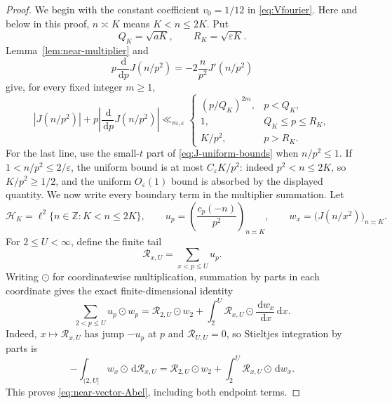 \documentclass[11pt]{article}
\numberwithin{equation}{section}
\theoremstyle{definition}
\newcommand{\Z}{\mathbb Z}
\newcommand{\1}{\mathbf 1}
\newcommand{\dd}{\,\mathrm d}
\begin{document}
\begin{proof}
We begin with the constant coefficient \(v_0=1/12\) in
\eqref{eq:Vfourier}.  Here and below in this proof, \(n\asymp K\)
means \(K<n\le2K\).  Put
\[
 Q_K=\sqrt{aK},\qquad R_K=\sqrt{\varepsilon K}.
\]
Lemma~\ref{lem:near-multiplier} and
\[
 p\frac{\dd}{\dd p}J(n/p^2)
 =-2\frac n{p^2}J'(n/p^2)
\]
give, for every fixed integer \(m\ge1\),
\begin{equation}\label{eq:Jbounds}
 |J(n/p^2)|+
 p\left|\frac{\dd}{\dd p}J(n/p^2)\right|
 \ll_{m,\varepsilon}
 \begin{cases}
 (p/Q_K)^{2m},&p<Q_K,\\
 1,&Q_K\le p\le R_K,\\
 K/p^2,&p>R_K.
 \end{cases}
\end{equation}
For the last line, use the small-\(t\) part of
\eqref{eq:J-uniform-bounds} when \(n/p^2\le1\).  If
\(1<n/p^2\le2/\varepsilon\), the uniform bound is at most
\(C_\varepsilon K/p^2\): indeed \(p^2<n\le2K\), so
\(K/p^2\ge1/2\), and the uniform \(O_\varepsilon(1)\) bound is
absorbed by the displayed quantity.
We now write every boundary term in the multiplier summation.  Let
\[
 \mathcal H_K=\ell^2\{n\in\Z:K<n\le2K\},\qquad
 u_p=\left(\frac{c_p(-n)}{p^2}\right)_{n\asymp K},
 \qquad
 w_x=\bigl(J(n/x^2)\bigr)_{n\asymp K}.
\]
For \(2\le U<\infty\), define the finite tail
\[
 \mathcal R_{x,U}=\sum_{x<p\le U}u_p.
\]
Writing \(\odot\) for coordinatewise multiplication, summation by parts
in each coordinate gives the exact finite-dimensional identity
\begin{equation}\label{eq:near-vector-Abel}
 \sum_{2<p\le U}u_p\odot w_p
 =
 \mathcal R_{2,U}\odot w_2+
 \int_2^U\mathcal R_{x,U}\odot
 \frac{\dd w_x}{\dd x}\dd x.
\end{equation}
Indeed, \(x\mapsto\mathcal R_{x,U}\) has jump \(-u_p\) at \(p\)
and \(\mathcal R_{U,U}=0\), so Stieltjes integration by parts is
\[
 -\int_{(2,U]}w_x\odot\dd\mathcal R_{x,U}
 =\mathcal R_{2,U}\odot w_2+
  \int_2^U\mathcal R_{x,U}\odot\dd w_x.
\]
This proves \eqref{eq:near-vector-Abel}, including both endpoint terms.


\end{proof}
\end{document}
